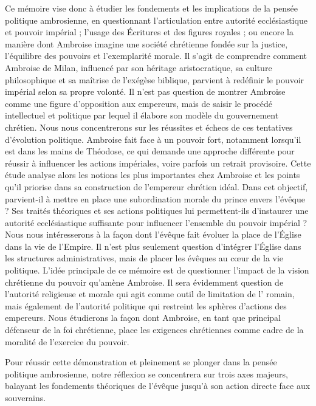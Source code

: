Ce mémoire vise donc à étudier les fondements et les implications de la pensée politique ambrosienne, en questionnant l’articulation entre autorité ecclésiastique et pouvoir impérial ; l’usage des Écritures et des figures royales ; ou encore la manière dont Ambroise imagine une société chrétienne fondée sur la justice, l’équilibre des pouvoirs et l’exemplarité morale. Il s'agit de comprendre comment Ambroise de Milan, influencé par son héritage aristocratique, sa culture philosophique et sa maîtrise de l'exégèse biblique, parvient à redéfinir le pouvoir impérial selon sa propre volonté. Il n'est pas question de montrer Ambroise comme une figure d'opposition aux empereurs, mais de saisir le procédé intellectuel et politique par lequel il élabore son modèle du gouvernement chrétien. Nous nous concentrerons sur les réussites et échecs de ces tentatives d'évolution politique. Ambroise fait face à un pouvoir fort, notamment lorsqu'il est dans les mains de Théodose, ce qui demande une approche différente pour réussir à influencer les actions impériales, voire parfois un retrait provisoire. Cette étude analyse alors les notions les plus importantes chez Ambroise et les points qu'il priorise dans sa construction de l'empereur chrétien idéal. Dans cet objectif, parvient-il à mettre en place une subordination morale du prince envers l'évêque ? Ses traités théoriques et ses actions politiques lui permettent-ils d'instaurer une autorité ecclésiastique suffisante pour influencer l'ensemble du pouvoir impérial ? Nous nous intéresserons à la façon dont l'évêque fait évoluer la place de l'Église dans la vie de l'Empire. Il n'est plus seulement question d'intégrer l'Église dans les structures administratives, mais de placer les évêques au cœur de la vie politique. L'idée principale de ce mémoire est de questionner l'impact de la vision chrétienne du pouvoir qu'amène Ambroise. Il sera évidemment question de l'autorité religieuse et morale qui agit comme outil de limitation de l' romain, mais également de l'autorité politique qui restreint les sphères d'actions des empereurs. Nous étudierons la façon dont Ambroise, en tant que principal défenseur de la foi chrétienne, place les exigences chrétiennes comme cadre de la moralité de l'exercice du pouvoir.

\bigskip

Pour réussir cette démonstration et pleinement se plonger dans la pensée politique ambrosienne, notre réflexion se concentrera sur trois axes majeurs, balayant les fondements théoriques de l'évêque jusqu'à son action directe face aux souverains.

